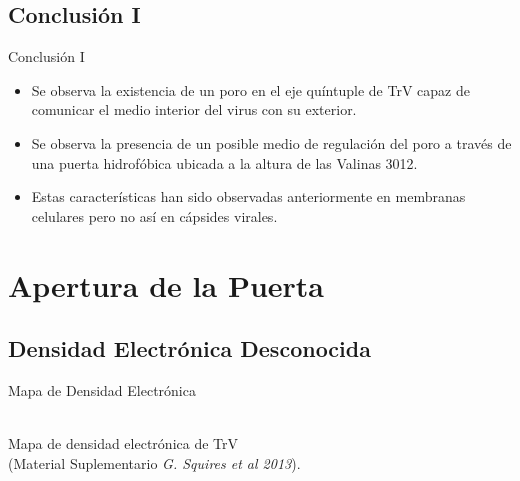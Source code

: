 \documentclass[8pt]{beamer}
\begin{document}
\subsection{Conclusión I}
\begin{frame}{Conclusión I}
\begin{itemize}
    \item Se observa la existencia de un poro en el eje quíntuple de TrV capaz de comunicar el medio interior del virus con su exterior.\vfill
    \item Se observa la presencia de un posible medio de regulación del poro a través de una puerta hidrofóbica ubicada a la altura de las Valinas 3012.\vfill
    \item Estas características han sido observadas anteriormente en membranas celulares pero no así en cápsides virales.
\end{itemize}
\end{frame}

%
%

\section{Apertura de la Puerta}
\subsection{Densidad Electrónica Desconocida}
\begin{frame}{Mapa de Densidad Electrónica}
\centering
{} \\
\centering Mapa de densidad electrónica de TrV \\(Material Suplementario \textit{G. Squires et al 2013}).
\end{frame}
\end{document}
